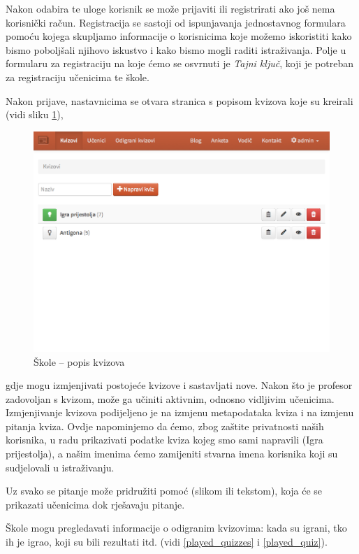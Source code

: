 \documentclass{scrreprt}
\begin{document}
Nakon odabira te uloge korisnik se može prijaviti ili registrirati ako još nema
korisnički račun. Registracija se sastoji od ispunjavanja jednostavnog formulara
pomoću kojega skupljamo informacije o korisnicima koje možemo iskoristiti kako
bismo poboljšali njihovo iskustvo i kako bismo mogli raditi istraživanja. Polje
u formularu za registraciju na koje ćemo se osvrnuti je \emph{Tajni ključ}, koji
je potreban za registraciju učenicima te škole.

Nakon prijave, nastavnicima se otvara stranica s popisom kvizova koje su
kreirali (vidi sliku \ref{fig:school/quizzes}),

\begin{figure}[H]
  \includegraphics[width=\textwidth, clip=true, trim=0 10cm 0 0, fbox]{school/quizzes}
  \caption{Škole -- popis kvizova}
  \label{fig:school/quizzes}
\end{figure}

gdje mogu izmjenjivati postojeće kvizove i sastavljati nove. Nakon što je
profesor zadovoljan s kvizom, može ga učiniti aktivnim, odnosno vidljivim
učenicima. Izmjenjivanje kvizova podijeljeno je na izmjenu metapodataka kviza i
na izmjenu pitanja kviza. Ovdje napominjemo da ćemo, zbog zaštite privatnosti
naših korisnika, u radu prikazivati podatke kviza kojeg smo sami napravili
(Igra prijestolja), a našim imenima ćemo zamijeniti stvarna imena korisnika
koji su sudjelovali u istraživanju.

Uz svako se pitanje može pridružiti pomoć (slikom ili tekstom), koja će se
prikazati učenicima dok rješavaju pitanje.

Škole mogu pregledavati informacije o odigranim kvizovima: kada su igrani, tko
ih je igrao, koji su bili rezultati itd. (vidi \ref{played_quizzes} i \ref{played_quiz}).
\end{document}

